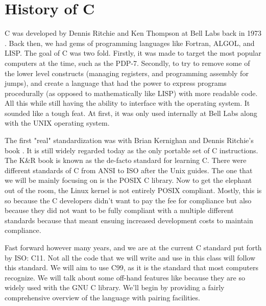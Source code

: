 \section{History of C}

C was developed by Dennis Ritchie and Ken Thompson at Bell Labs back in 1973 \cite{Ritchie:1993:DCL:155360.155580}.
Back then, we had gems of programming languages like Fortran, ALGOL, and LISP.
The goal of C was two fold.
Firstly, it was made to target the most popular computers at the time, such as the PDP-7.
Secondly, to try to remove some of the lower level constructs (managing registers, and programming assembly for jumps), and create a language that had the power to express programs procedurally (as opposed to mathematically like LISP) with more readable code. All this while still having the ability to interface with the operating system.
It sounded like a tough feat.
At first, it was only used internally at Bell Labs along with the UNIX operating system.

The first "real" standardization was with Brian Kernighan and Dennis Ritchie's book \cite{kernighan1988c}. It is still widely regarded today as the only \gls{portable} set of C instructions. The K\&R book is known as the de-facto standard for learning C.  There were different standards of C from ANSI to ISO after the Unix guides. The one that we will be mainly focusing on is the \gls{POSIX} C library. Now to get the elephant out of the room, the Linux kernel is not entirely POSIX compliant. Mostly, this is so because the C developers didn't want to pay the fee for compliance but also because they did not want to be fully compliant with a multiple different standards because that meant ensuing increased development costs to maintain compliance.

Fast forward however many years, and we are at the current C standard put forth by ISO: C11.
Not all the code that we will write and use in this class will follow this standard.
We will aim to use C99, as it is the standard that most computers recognize.
We will talk about some off-hand features like  because they are so widely used with the GNU C library.
We'll begin by providing a fairly comprehensive overview of the language with pairing facilities.


